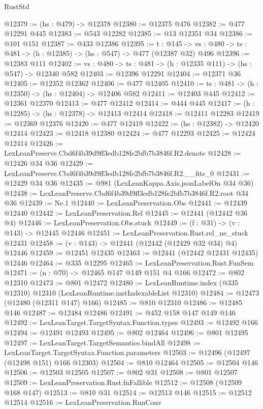 \begin{lexlean}{RustStd}
\begin{coremodule}
@12379 := (hs : @479) -> @12378
@12380 := @12375 @476
@12382 := @477 @12291 @445
@12383 := @543 @12282
@12385 := @13 @12351 @34
@12386 := @101 @151
@12387 := @433 @12386
@12395 := {t : @145} ->
  {vs : @480} -> {ts : @481} -> (h : @12385) -> (hs : @547) -> @477 (@12387 @32) @496
@12396 := @12383 @111
@12402 := {vs : @480} -> {ts : @481} -> (h : @12335 @111) -> (hs : @547) -> @12340 @582
@12403 := @12396 @12291
@12404 := @12371 @36
@12405 := @12352 @12362
@12406 := @477 @12405
@12410 := {ts : @481} -> (h : @12350) -> (hs : @12404) -> @12406 @582
@12411 := @12403 @445
@12412 := @12361 @12370
@12413 := @477 @12412
@12414 := @444 @445
@12417 := (h : @12285) -> (hs : @12378) -> @12413 @12414
@12418 := @12411 @12283
@12419 := @12369 @12376
@12420 := @477 @12419
@12422 := (hs : @12382) -> @12420 @12414
@12423 := @12418 @12380
@12424 := @477 @12293
@12425 := @12424 @12414
@12426 := LexLeanPreserve.Cbd6f4b39d9ff3edb128fe2bfb7b3846f.R2.denote
@12428 := @12426 @34 @36
@12429 := LexLeanPreserve.Cbd6f4b39d9ff3edb128fe2bfb7b3846f.R2.__fits_0
@12431 := @12429 @34 @36
@12435 := @981 (LexLeanKappa.Axis.jsonLabelOn @34 @36)
@12438 := LexLeanPreserve.Cbd6f4b39d9ff3edb128fe2bfb7b3846f.R2.root @34 @36
@12439 := Ne.{1}
@12440 := LexLeanPreservation.Obs
@12441 := @12439 @12440
@12442 := LexLeanPreservation.Rel
@12445 := @12441 (@12442 @36 @4)
@12446 := LexLeanPreservation.Obs.stuck
@12449 := (f : @31) -> (v : @143) -> @12445 @12446
@12451 := LexLeanPreservation.Rust.rel_ne_stuck @12431
@12458 := (v : @143) -> @12441 (@12442 (@12429 @32 @34) @4) @12446
@12459 := @12451 @12435
@12463 := @12441 (@12442 @12431 @12435) @12446
@12464 := @335 @12295
@12465 := LexLeanPreservation.Rust.FunSem
@12471 := (n : @70) -> @12465 @147 @149 @151 @4 @166
@12472 := @802 @12310
@12473 := @801 @12472
@12480 := LexLeanRuntime.index (@335 @12310) @12310 (LexLeanRuntime.instIndexableList @12310)
@12484 := @12473 (@12480 (@12311 @147) @166)
@12485 := @810 @12310
@12486 := @12485 @146
@12487 := @12484 @12486
@12491 := @452 @158 @147 @149 @146
@12492 := LexLeanTarget.TargetSyntax.Function.types
@12493 := @12492 @166
@12494 := @12491 @12493
@12495 := @802 @12464
@12496 := @801 @12495
@12497 := LexLeanTarget.TargetSemantics.bindAll
@12498 := LexLeanTarget.TargetSyntax.Function.parameters
@12503 := @12496 (@12497 (@12498 @151) @166 @12303)
@12504 := @810 @12464
@12505 := @12504 @146
@12506 := @12503 @12505
@12507 := @802 @31
@12508 := @801 @12507
@12509 := LexLeanPreservation.Rust.fnFallible
@12512 := @12508 (@12509 @168 @147)
@12513 := @810 @31
@12514 := @12513 @146
@12515 := @12512 @12514
@12516 := LexLeanPreservation.RunConv

\end{coremodule}
\end{lexlean}
